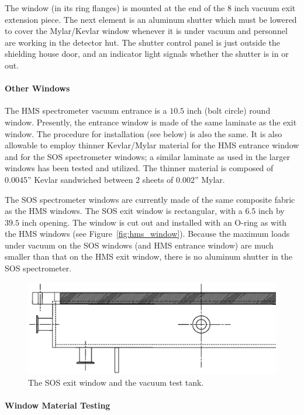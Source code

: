 The window (in its ring flanges) is mounted at the end of the $8$ inch
vacuum exit extension piece. The next element is an aluminum shutter which
must be lowered to cover the Mylar/Kevlar window whenever it is under
vacuum and personnel are working in the detector hut. The shutter
control panel is just outside the shielding house door, and an
indicator light signals whether the shutter is in or out.  

\paragraph{Other Windows}

The HMS spectrometer vacuum entrance is a $10.5$ inch (bolt circle) round
window. Presently, the entrance window
is made of the same laminate as the exit window. The
procedure for installation (see below) is also the same.
It is
also allowable to employ thinner Kevlar/Mylar
material for the HMS entrance window and for
the SOS spectrometer windows; a similar laminate as used in the
larger windows has been tested and utilized.  The thinner material is
composed of 0.0045'' Kevlar sandwiched between 2 sheets of 0.002'' Mylar.

The SOS spectrometer windows are currently made of the same composite fabric
as the HMS windows. The SOS exit window is rectangular, with a $6.5$ inch
by $39.5$ inch opening.
The window is cut out and installed with an O-ring as with the HMS
windows (see Figure~\ref{fig:hms_window}).
Because the maximum
loads under vacuum on the SOS windows (and HMS entrance window)
are much smaller than that on the HMS exit window,
there is
no aluminum shutter in the SOS spectrometer.

\begin{figure}
\includegraphics[width=6in]{figSOSwindow.eps}
\caption{The SOS exit window and the vacuum test tank. \label{fig:sos_window}}
\end{figure}

\paragraph{Window Material Testing}

